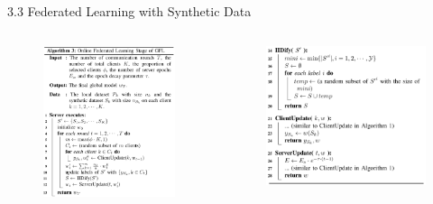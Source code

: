 \documentclass{sintefbeamer}
\theoremstyle{definition}
\begin{document}
\begin{frame}{3.3 Federated Learning with Synthetic Data}
\begin{columns}
\begin{column}{0.4\textwidth}
\begin{figure}[ht]
\centering
\includegraphics[width=1\textwidth]{images/algo3_1}
\end{figure}

\end{column}
\begin{column}{0.4\textwidth}
\begin{figure}[ht]
\centering
\includegraphics[width=1\textwidth]{images/algo3_2}
\end{figure}
\end{column}
\end{columns}
\end{frame}
\end{document}
